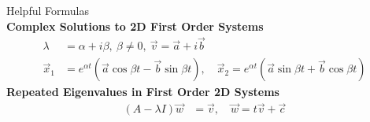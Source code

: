 \ID

\begin{center}
    \setlength{\extrarowheight}{0.25cm}
    {\Large Helpful Formulas} \\
    \vspace{12pt}
    \textbf{Complex Solutions to 2D First Order Systems}
    \begin{align*}
        \lambda &= \alpha + i \beta, \ \beta \ne 0 , \ \vec v = \vec a + i \vec b \\
        \vec x_1 &= e^{\alpha t} (\vec a \cos \beta t - \vec b \sin \beta t), \quad 
        \vec x_{2} = e^{\alpha t} (\vec a \sin \beta t + \vec b \cos \beta t)
    \end{align*}
    \textbf{Repeated Eigenvalues in First Order 2D Systems}
    \begin{align*}
        (A-\lambda I) \vec w &= \vec v, \quad \vec w = t\vec v + \vec c
    \end{align*}    
\end{center}